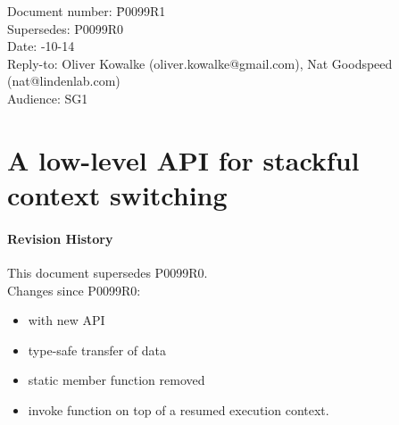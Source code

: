 \documentclass[paper=A4,pagesize,DIV=15]{scrartcl}
\begin{document}
\small
\begin{tabbing}
    Document number: \= P0099R1\\
    Supersedes:      \> P0099R0\\
    Date:            -10-14\\
    Reply-to:        \> Oliver Kowalke (oliver.kowalke@gmail.com), Nat Goodspeed (nat@lindenlab.com)\\
    Audience:        \> SG1\\
\end{tabbing}

\section*{A low-level API for stackful context switching}


\tableofcontents


\paragraph*{Revision History}
This document supersedes P0099R0.\\
\newline
Changes since P0099R0:

\begin{itemize}
    \item \ectx with new API
    \item type-safe transfer of data
    \item static member function  removed
    \item invoke function on top of a resumed execution context.
\end{itemize}

\newpage





\newpage







\end{document}
